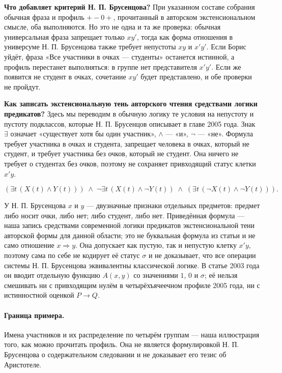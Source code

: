 \documentclass[12pt,a4paper]{article}
\begin{document}
\textbf{Что добавляет критерий Н. П. Брусенцова?} При указанном составе собрания обычная фраза и профиль \(+-0+\), прочитанный в авторском экстенсиональном смысле, оба выполняются. Но это не одна и та же проверка: обычная универсальная фраза запрещает только \(xy'\), тогда как форма отношения в универсуме Н. П. Брусенцова также требует непустоты \(xy\) и \(x'y'\). Если Борис уйдёт, фраза «Все участники в очках — студенты» останется истинной, а профиль перестанет выполняться: в группе нет представителя \(x'y'\). Если же появится не студент в очках, сочетание \(xy'\) будет представлено, и обе проверки не пройдут.

\textbf{Как записать экстенсиональную тень авторского чтения средствами логики предикатов?} Здесь мы переводим в обычную логику те условия на непустоту и пустоту подклассов, которые Н. П. Брусенцов описывает в главе 2005 года. Знак \(\exists\) означает «существует хотя бы один участник», \(\land\) — «и», \(\neg\) — «не». Формула требует участника в очках и студента, запрещает человека в очках, который не студент, и требует участника без очков, который не студент. Она ничего не требует о студентах без очков, поэтому не сохраняет привходящий статус клетки \(x'y\).

\[
(\exists t\,(X(t)\land Y(t)))\;\land\; \neg\exists t\,(X(t)\land\neg Y(t))\;\land\; (\exists t\,(\neg X(t)\land\neg Y(t))).
\]

У Н. П. Брусенцова \(x\) и \(y\) — двузначные признаки отдельных предметов: предмет либо носит очки, либо нет; либо студент, либо нет. Приведённая формула — наша запись средствами современной логики предикатов экстенсиональной тени авторской формы для данной области; это не буквальная формула из статьи и не само отношение \(x\Rightarrow y\). Она допускает как пустую, так и непустую клетку \(x'y\), поэтому сама по себе не кодирует её статус \(\sigma\) и не доказывает, что все операции системы Н. П. Брусенцова эквивалентны классической логике. В статье 2003 года он вводит отдельную функцию \(A(x,y)\) со значениями \(1\), \(0\) и \(\sigma\); её нельзя смешивать ни с привходящим нулём в четырёхъячеечном профиле 2005 года, ни с истинностной оценкой \(P\to Q\).

\paragraph{Граница примера.} Имена участников и их распределение по четырём группам — наша иллюстрация того, как можно прочитать профиль. Она не является формулировкой Н. П. Брусенцова о содержательном следовании и не доказывает его тезис об Аристотеле.
\end{document}
